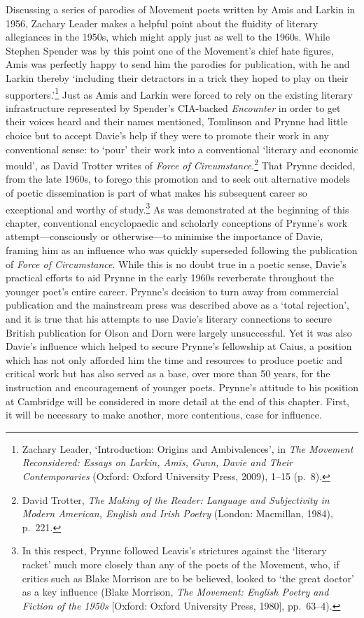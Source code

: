 \documentclass[]{article}
\begin{document}
Discussing a series of parodies of Movement poets written by Amis and
Larkin in 1956, Zachary Leader makes a helpful point about the fluidity
of literary allegiances in the 1950s, which might apply just as well to
the 1960s. While Stephen Spender was by this point one of the Movement's
chief hate figures, Amis was perfectly happy to send him the parodies
for publication, with he and Larkin thereby `including their detractors
in a trick they hoped to play on their supporters.'\footnote{Zachary
  Leader, `Introduction: Origins and Ambivalences', in \emph{The
  Movement Reconsidered: Essays on Larkin, Amis, Gunn, Davie and Their
  Contemporaries} (Oxford: Oxford University Press, 2009), 1--15 (p.~8).}
Just as Amis and Larkin were forced to rely on the existing literary
infrastructure represented by Spender's CIA-backed \emph{Encounter} in
order to get their voices heard and their names mentioned, Tomlinson and
Prynne had little choice but to accept Davie's help if they were to
promote their work in any conventional sense: to `pour' their work into
a conventional `literary and economic mould', as David Trotter writes of
\emph{Force of Circumstance}.\footnote{David Trotter, \emph{The Making
  of the Reader: Language and Subjectivity in Modern American, English
  and Irish Poetry} (London: Macmillan, 1984), p.~221.} That Prynne
decided, from the late 1960s, to forego this promotion and to seek out
alternative models of poetic dissemination is part of what makes his
subsequent career so exceptional and worthy of study.\footnote{In this
  respect, Prynne followed Leavis's strictures against the `literary
  racket' much more closely than any of the poets of the Movement, who,
  if critics such as Blake Morrison are to be believed, looked to `the
  great doctor' as a key influence (Blake Morrison, \emph{The Movement:
  English Poetry and Fiction of the 1950s} {[}Oxford: Oxford University
  Press, 1980{]}, pp.~63--4).} As was demonstrated at the beginning of
this chapter, conventional encyclopaedic and scholarly conceptions of
Prynne's work attempt---consciously or otherwise---to minimise the
importance of Davie, framing him as an influence who was quickly
superseded following the publication of \emph{Force of Circumstance}.
While this is no doubt true in a poetic sense, Davie's practical efforts
to aid Prynne in the early 1960s reverberate throughout the younger
poet's entire career. Prynne's decision to turn away from commercial
publication and the mainstream press was described above as a `total
rejection', and it is true that his attempts to use Davie's literary
connections to secure British publication for Olson and Dorn were
largely unsuccessful. Yet it was also Davie's influence which helped to
secure Prynne's fellowship at Caius, a position which has not only
afforded him the time and resources to produce poetic and critical work
but has also served as a base, over more than 50 years, for the
instruction and encouragement of younger poets. Prynne's attitude to his
position at Cambridge will be considered in more detail at the end of
this chapter. First, it will be necessary to make another, more
contentious, case for influence.
\end{document}
